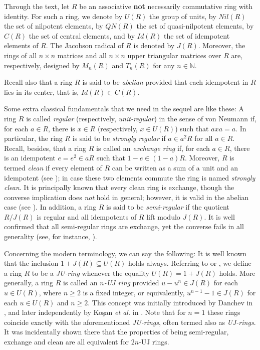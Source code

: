 \documentclass[12pt]{amsart}
\theoremstyle{definition}
\begin{document}
Through the text, let $R$ be an associative {\bf not} necessarily commutative ring with identity. For such a ring, we denote by $U(R)$ the group of units, by $Nil(R)$ the set of nilpotent elements, by $QN(R)$ the set of quasi-nilpotent elements, by $C(R)$ the set of central elements, and by $Id(R)$ the set of idempotent elements of $R$. The Jacobson radical of $R$ is denoted by $J(R)$. Moreover, the rings of all $n \times n$ matrices and all $n \times n$ upper triangular matrices over $R$ are, respectively, designed by $M_n(R)$ and $T_n(R)$ for any $n\in \mathbb{N}$.

Recall also that a ring $R$ is said to be {\it abelian} provided that each idempotent in $R$ lies in its center, that is, $Id(R)\subset C(R)$.

Some extra classical fundamentals that we need in the sequel are like these: A ring $R$ is called {\it regular} (respectively, {\it unit-regular}) in the sense of von Neumann if, for each $a \in R$, there is $x \in R$ (respectively, $x \in U(R)$) such that $axa = a$. In particular, the ring $R$ is said to be {\it strongly regular} if $a \in a^2 R$ for all $a \in R$. Recall, besides, that a ring $R$ is called an {\it exchange ring} if, for each $a \in R$, there is an idempotent $e = e^2 \in aR$ such that $1 - e \in (1 - a)R$. Moreover, $R$ is termed {\it clean} if every element of $R$ can be written as a sum of a unit and an idempotent (see \cite{5}); in case these two elements commute the ring is named {\it strongly clean}. It is principally known that every clean ring is exchange, though the converse implication does {\it not} hold in general; however, it is valid in the abelian case (see \cite[Proposition 1.8]{5}). In addition, a ring $R$ is said to be {\it semi-regular} if the quotient $R/J(R)$ is regular and all idempotents of $R$ lift modulo $J(R)$. It is well confirmed that all semi-regular rings are exchange, yet the converse fails in all generality (see, for instance, \cite{5}).

Concerning the modern terminology, we can say the following: It is well known that the inclusion $1+J(R) \subseteq U(R)$ holds always. Referring to \cite{Danew} or \cite{KLM}, we define a ring $R$ to be a {\it JU-ring} whenever the equality $U(R)=1+J(R)$ holds. More generally, a ring $R$ is called an {\it $n$-UJ ring} provided $u - u^n \in J(R)$ for each $u \in U(R)$, where $n \geq 2$ is a fixed integer, or equivalently, $u^{n-1} - 1 \in J(R)$ for each $u \in U(R)$ and $n\geq 2$. This concept was initially introduced by Danchev in \cite{Dannew}, and later independently by Ko\c{s}an {\it et al.} in \cite{3}. Note that for $n = 1$ these rings coincide exactly with the aforementioned {\it JU-rings}, often termed also as {\it UJ-rings}. It was incidentally shown there that the properties of being semi-regular, exchange and clean are all equivalent for $2n$-UJ rings.
\end{document}
